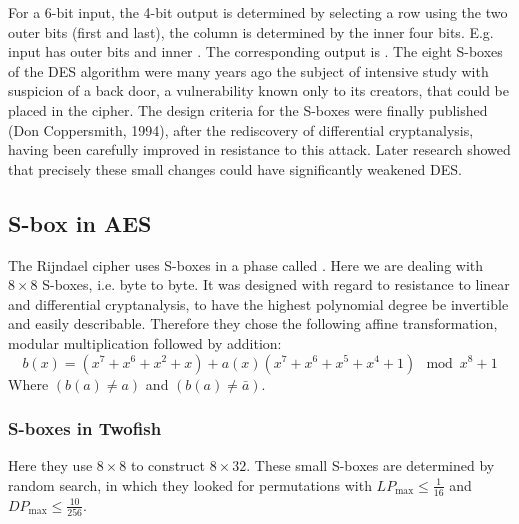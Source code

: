 For a 6-bit input, the 4-bit output is determined by selecting a row using the two outer bits (first and last),
the column is determined by the inner four bits. E.g. input  has outer bits  and inner .
The corresponding output is .
The eight S-boxes of the DES algorithm were many years ago the subject of intensive study with suspicion of a back
door, a vulnerability known only to its creators, that could be placed in the cipher.
The design criteria for the S-boxes were finally published (Don Coppersmith, 1994),
after the rediscovery of differential cryptanalysis,
having been carefully improved in resistance to this attack.
Later research showed that precisely these small changes could have significantly weakened DES.

\subsection{S-box in AES}
The Rijndael cipher\cite{rijndael, wikiRijnDaelSbox} uses S-boxes in a phase called .
Here we are dealing with $8 \times 8$ S-boxes,
i.e. byte to byte. It was designed with regard to resistance to linear and differential cryptanalysis,
to have the highest polynomial degree be invertible and easily describable.
Therefore they chose the following affine transformation, modular multiplication
followed by addition:
\begin{equation}
b(x) = (x^7 + x^6 + x^2 + x) + a(x)(x^7 + x^6 + x^5 + x^4 + 1) \mod x^8 + 1
\end{equation}
Where $(b(a) \neq a)$ and $(b(a) \neq \bar{a} )$.

\subsubsection{S-boxes in Twofish}
Here \cite{twofish} they use $8 \times 8$ to construct $8 \times 32$.
These small S-boxes are determined by random search, in which they looked for permutations
with $LP_{\max} \leq \frac{1}{16}$ and $DP_{\max} \leq \frac{10}{256}$.
